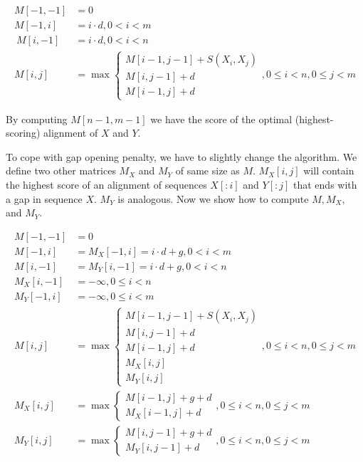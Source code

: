 \begin{align} 
M[-1,-1] &= 0\\
M[-1,i] &= i\cdot d, 0< i < m\\\
M[i,-1] &= i\cdot d, 0< i < n\\
M[i,j] &= \max
\begin{cases}
 M[i-1,j-1]+S(X_i,X_j)\\M[i,j-1]+d\\
 M[i-1,j]+d
\end{cases}, 0\leq i<n,0\leq j<m \label{ALIGN:ALGO:AFFINE}
\end{align}

By computing $M[n-1,m-1]$ we have the score of the optimal (highest-scoring) alignment of $X$ and $Y$. 

To cope with gap opening penalty, we have to slightly change the algorithm.
We define two other matrices $M_X$ and $M_Y$ of same size as $M$. $M_X[i,j]$
will contain the highest score of an alignment of sequences $X[:i]$ and $Y[:j]$
that ends
with a gap in sequence $X$. $M_Y$ is analogous. Now we show how to compute
$M,M_X,$
and $M_Y$. 

\begin{align}
M[-1,-1] &= 0\\
M[-1,i] &= M_X[-1,i] = i\cdot d+g, 0 < i < m\\
M[i,-1] &= M_Y[i,-1] = i\cdot d+g, 0 < i < n\\
M_X[i,-1] &= -\infty, 0\leq i< n\\
M_Y[-1,i] &= -\infty, 0 \leq i< m\\
M[i,j] &= \max
\begin{cases}\label{ALIGN:ALGO:REALAFFINESTART}
 M[i-1,j-1]+S(X_i,X_j)\\
 M[i,j-1]+d\\
 M[i-1,j]+d\\
 M_X[i,j]\\
 M_Y[i,j]
\end{cases}, 0\leq i<n,0\leq j<m\\
M_X[i,j] &= \max
\begin{cases}
M[i-1,j]+g+d\\
M_X[i-1,j]+d
\end{cases}, 0\leq i<n,0\leq j<m\\
M_Y[i,j] &= \max
\begin{cases}
M[i,j-1]+g+d\\
M_Y[i,j-1]+d
\end{cases}, 0\leq i<n,0\leq j<m\label{ALIGN:ALGO:REALAFFINEEND}
\end{align}




